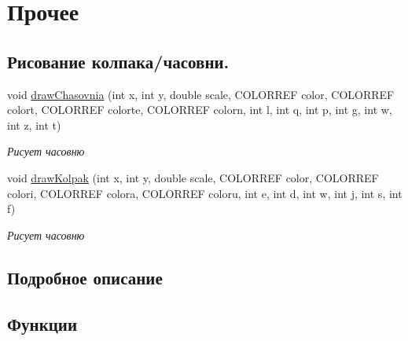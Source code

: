 \hypertarget{group___xD0_x9F_xD1_x80_xD0_xBE_xD1_x87_xD0_xB5_xD0_xB5}{}\section{Прочее}
\label{group___xD0_x9F_xD1_x80_xD0_xBE_xD1_x87_xD0_xB5_xD0_xB5}
\subsection*{Рисование колпака/часовни.}
\begin{DoxyCompactItemize}
\item 
void \hyperlink{group___xD0_x9F_xD1_x80_xD0_xBE_xD1_x87_xD0_xB5_xD0_xB5_gaca8114d8b42eeb1daa86ff2b88b7e603}{draw\+Chasovnia} (int x, int y, double scale, C\+O\+L\+O\+R\+R\+EF color, C\+O\+L\+O\+R\+R\+EF colort, C\+O\+L\+O\+R\+R\+EF colorte, C\+O\+L\+O\+R\+R\+EF colorn, int l, int q, int p, int g, int w, int z, int t)
\begin{DoxyCompactList}\small\item\em Рисует часовню \end{DoxyCompactList}\item 
void \hyperlink{group___xD0_x9F_xD1_x80_xD0_xBE_xD1_x87_xD0_xB5_xD0_xB5_gaba1fed4000eccfe144e90b4fd8d5cd66}{draw\+Kolpak} (int x, int y, double scale, C\+O\+L\+O\+R\+R\+EF color, C\+O\+L\+O\+R\+R\+EF colori, C\+O\+L\+O\+R\+R\+EF colora, C\+O\+L\+O\+R\+R\+EF coloru, int e, int d, int w, int j, int s, int f)
\begin{DoxyCompactList}\small\item\em Рисует часовню \end{DoxyCompactList}\end{DoxyCompactItemize}


\subsection{Подробное описание}


\subsection{Функции}
\hypertarget{group___xD0_x9F_xD1_x80_xD0_xBE_xD1_x87_xD0_xB5_xD0_xB5_gaca8114d8b42eeb1daa86ff2b88b7e603}{}\label{group___xD0_x9F_xD1_x80_xD0_xBE_xD1_x87_xD0_xB5_xD0_xB5_gaca8114d8b42eeb1daa86ff2b88b7e603} 
